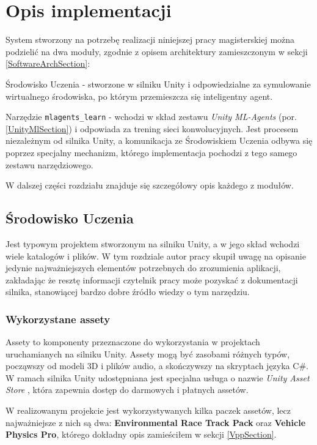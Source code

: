 \chapter{Opis implementacji}
\label{ImplementationChapter}
System stworzony na potrzebę realizacji niniejszej pracy magisterskiej można podzielić na dwa moduły, zgodnie z opisem architektury zamieszczonym w sekcji \ref{SoftwareArchSection}:
\begin{enumerate*}
\item Środowisko Uczenia - stworzone w silniku Unity i odpowiedzialne za symulowanie wirtualnego środowiska, po którym przemieszcza się inteligentny agent.
\item Narzędzie \texttt{mlagents\_learn} - wchodzi w skład zestawu \textit{Unity ML-Agents} (por. \ref{UnityMlSection}) i odpowiada za trening sieci konwolucyjnych. Jest procesem niezależnym od silnika Unity, a komunikacja ze Środowiskiem Uczenia odbywa się poprzez specjalny mechanizm, którego implementacja pochodzi z tego samego zestawu narzędziowego.
\end{enumerate*}

W dalszej części rozdziału znajduje się szczegółowy opis każdego z modułów.

\section{Środowisko Uczenia}
Jest typowym projektem stworzonym na silniku Unity, a w jego skład wchodzi wiele katalogów i plików. W tym rozdziale autor pracy skupił uwagę na opisanie jedynie najważniejszych elementów potrzebnych do zrozumienia aplikacji, zakładając że resztę informacji czytelnik pracy może pozyskać z dokumentacji silnika, stanowiącej bardzo dobre źródło wiedzy o tym narzędziu.

\subsection{Wykorzystane assety}
Assety to komponenty przeznaczone do wykorzystania w projektach uruchamianych na silniku Unity. Assety mogą być zasobami różnych typów, począwszy od modeli 3D i plików audio, a skończywszy na skryptach języka C\#. W ramach silnika Unity udostępniana jest specjalna usługa o nazwie \textit{Unity Asset Store} \cite{unity:assetStore}, która zapewnia dostęp do darmowych i płatnych assetów.

W realizowanym projekcie jest wykorzystywanych kilka paczek assetów, lecz najważniejsze z nich są dwa: \textbf{Environmental Race Track Pack} oraz \textbf{Vehicle Physics Pro}, którego dokładny opis zamieściłem w sekcji \ref{VppSection}.

